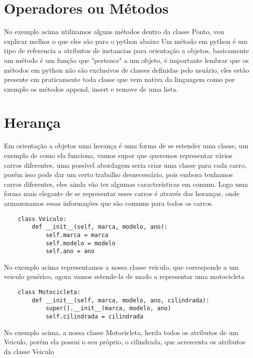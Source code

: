     \section{Operadores ou M\'{e}todos}
    No exemplo acima utilizamos alguns métodos dentro da classe Ponto, vou explicar melhor o que eles são para o python abaixo \newline
    Um método em python é um tipo de referencia a atributos de instancias para orientação a objetos, basicamente um método é um função que "pertence" a um objeto, é importante lembrar que os métodos em python não são exclusivos de classes definidas pelo usuário, eles estão presente em praticamente toda classe que vem nativa da linguagem como por exemplo os métodos append, insert e remove de uma lista.

    \section{Heran\c{c}a}
    Em orientação a objetos uma herança é uma forma de se estender uma classe, um exemplo de como ela funciona, vamos supor que queremos representar vários carros diferentes, uma possível abordagem seria criar uma classe para cada carro, porém isso pode dar um certo trabalho desnecessário, pois embora tenhamos carros diferentes, eles ainda vão ter algumas características em comum. Logo uma forma mais elegante de se representar esses carros é através das heranças, onde armazenamos essas informações que são comums para todos os carros.
    
    \begin{lstlisting}
    class Veiculo:
        def __init__(self, marca, modelo, ano):
            self.marca = marca
            self.modelo = modelo
            self.ano = ano
    \end{lstlisting}
    
    No exemplo acima representamos a nossa classe veiculo, que corresponde a um veiculo genérico, agora vamos estende-la de modo a representar uma motocicleta
    
    \begin{lstlisting}
    class Motocicleta:
        def __init__(self, marca, modelo, ano, cilindrada):
            super().__init__(marca, modelo, ano)
            self.cilindrada = cilindrada
    \end{lstlisting}
    
    No exemplo acima, a nossa classe Motocicleta, herda todos os atributos de um Veiculo, porém ela possui o seu próprio, o cilindrada, que acrescenta os atributos da classe Veiculo
